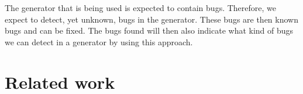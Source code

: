 The generator that is being used is expected to contain bugs. Therefore, we expect to detect, yet unknown, bugs in the generator. These bugs are then known bugs and can be fixed. The bugs found will then also indicate what kind of bugs we can detect in a generator by using this approach.


\section{Related work}

